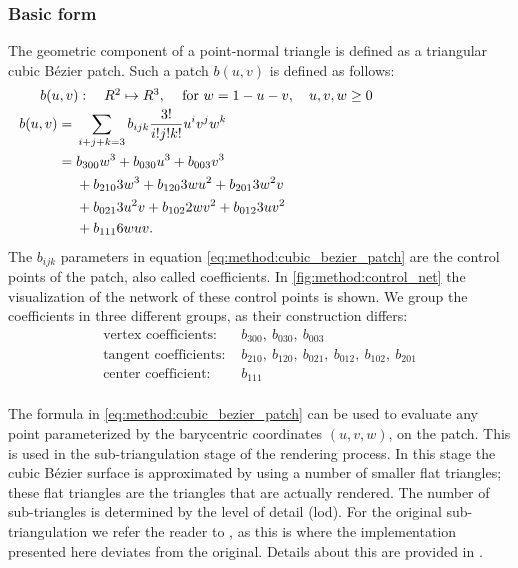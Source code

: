 \subsubsection{Basic form}
The geometric component of a point-normal triangle is defined as a triangular cubic Bézier patch. Such a patch $b(u,v)$ is defined as follows:
%
\begin{align}
\noalign{$b(u,v): \quad R^2 \mapsto R^3,\quad$ for $w = 1 - u - v, \quad u, v, w \geq 0$}
\begin{split}\label{eq:method:cubic_bezier_patch}
    b(u,v) ={}& \sum_{i + j + k = 3} b_{ijk}\frac{3!}{i!j!k!} u^i v^j w^k\\
      	   ={}& b_{300}w^3 + b_{030}u^3 + b_{003}v^3\\
      	    {}& + b_{210}3w^3 + b_{120}3wu^2 + b_{201}3w^2v\\
      	    {}& + b_{021}3u^2v + b_{102}2wv^2 + b_{012}3uv^2\\
      	    {}& + b_{111}6wuv.
\end{split}
\end{align}
%
The $b_{ijk}$ parameters in equation \ref{eq:method:cubic_bezier_patch} are the control points of the patch, also called coefficients. In \cref{fig:method:control_net} the visualization of the network of these control points is shown. We group the coefficients in three different groups, as their construction differs:
%
\begin{align*}
	\text{vertex coefficients: } {}&  b_{300},\ b_{030},\ b_{003} \\
	\text{tangent coefficients: } {}&  b_{210},\ b_{120},\ b_{021},\ b_{012},\ b_{102},\ b_{201}\\
	\text{center coefficient: }   {}&  b_{111}\\
\end{align*}

The formula in \eqref{eq:method:cubic_bezier_patch} can be used to evaluate any point parameterized by the barycentric coordinates $(u,v,w)$, on the patch. This is used in the sub-triangulation stage of the rendering process. In this stage the cubic Bézier surface is approximated by using a number of smaller flat triangles; these flat triangles are the triangles that are actually rendered. The number of sub-triangles is determined by the level of detail (lod). For the original sub-triangulation we refer the reader to \textcite{vlachos2001curved}, as this is where the implementation presented here deviates from the original. Details about this are provided in .

